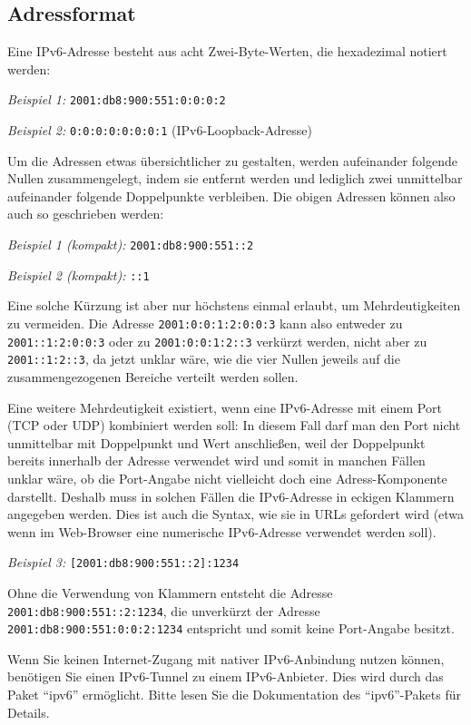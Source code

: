 \subsection{Adressformat}

Eine IPv6-Adresse besteht aus acht Zwei-Byte-Werten, die hexadezimal notiert
werden:

\emph{Beispiel 1:} \verb*?2001:db8:900:551:0:0:0:2?

\emph{Beispiel 2:} \verb*?0:0:0:0:0:0:0:1? (IPv6-Loopback-Adresse)

Um die Adressen etwas übersichtlicher zu gestalten, werden aufeinander folgende
Nullen zusammengelegt, indem sie entfernt werden und lediglich zwei unmittelbar
aufeinander folgende Doppelpunkte verbleiben. Die obigen Adressen können also
auch so geschrieben werden:

\emph{Beispiel 1 (kompakt):} \verb*?2001:db8:900:551::2?

\emph{Beispiel 2 (kompakt):} \verb*?::1?

Eine solche Kürzung ist aber nur höchstens einmal erlaubt, um Mehrdeutigkeiten
zu vermeiden. Die Adresse \verb*?2001:0:0:1:2:0:0:3? kann also entweder zu
\verb*?2001::1:2:0:0:3? oder zu \verb*?2001:0:0:1:2::3? verkürzt werden, nicht
aber zu \verb*?2001::1:2::3?, da jetzt unklar wäre, wie die vier Nullen jeweils
auf die zusammengezogenen Bereiche verteilt werden sollen.

Eine weitere Mehrdeutigkeit existiert, wenn eine IPv6-Adresse mit einem Port
(TCP oder UDP) kombiniert werden soll: In diesem Fall darf man den Port nicht
unmittelbar mit Doppelpunkt und Wert anschließen, weil der Doppelpunkt bereits
innerhalb der Adresse verwendet wird und somit in manchen Fällen unklar wäre,
ob die Port-Angabe nicht vielleicht doch eine Adress-Komponente darstellt.
Deshalb muss in solchen Fällen die IPv6-Adresse in eckigen Klammern angegeben
werden. Dies ist auch die Syntax, wie sie in URLs gefordert wird (etwa wenn
im Web-Browser eine numerische IPv6-Adresse verwendet werden soll).

\emph{Beispiel 3:} \verb*?[2001:db8:900:551::2]:1234?

Ohne die Verwendung von Klammern entsteht die Adresse
\verb*?2001:db8:900:551::2:1234?, die unverkürzt der Adresse
\verb*?2001:db8:900:551:0:0:2:1234? entspricht und somit keine Port-Angabe
besitzt.

Wenn Sie keinen Internet-Zugang mit nativer IPv6-Anbindung nutzen können,
benötigen Sie einen IPv6-Tunnel zu einem IPv6-Anbieter. Dies wird durch das
Paket ``ipv6'' ermöglicht. Bitte lesen Sie die Dokumentation des ``ipv6''-Pakets
für Details.

